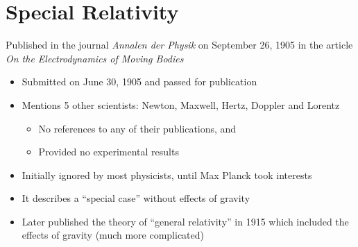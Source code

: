 \section{Special Relativity}
Published in the journal \emph{Annalen der Physik} on September
26, 1905 in the article \emph{On the Electrodynamics of Moving
Bodies}\cite{einstein-special-relativity}
\begin{itemize}
\item Submitted on June 30, 1905 and passed for publication
\item Mentions 5 other scientists: Newton, Maxwell, Hertz, Doppler and Lorentz
  \begin{itemize}
  \item No references to any of their publications, and
  \item Provided no experimental results
  \end{itemize}
  \item Initially ignored by most physicists, until Max Planck took interests
  \item It describes a ``special case'' without effects of gravity
  \item Later published the theory of ``general relativity'' in 1915 which
    included the effects of gravity (much more complicated)
\end{itemize}




